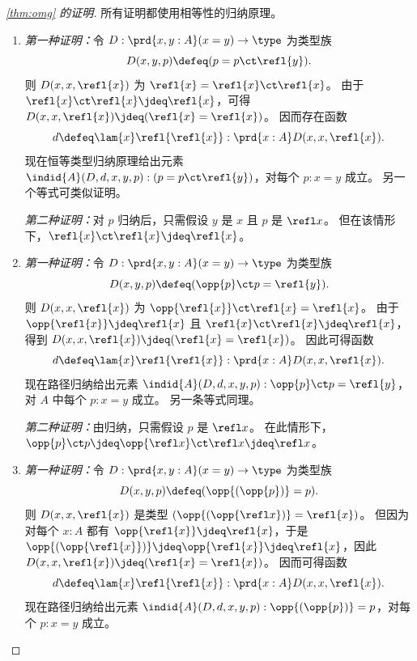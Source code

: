 \begin{proof}[\cref{thm:omg} 的证明]
  所有证明都使用相等性的归纳原理。
  \begin{enumerate}
  \item \emph{第一种证明：}令 $D:\prd{x,y:A} (x=y) \to \type$ 为类型族
    \begin{equation*}
      D(x,y,p)\defeq (p= p\ct \refl{y}).
    \end{equation*}
    则 $D(x,x,\refl{x})$ 为 $\refl{x}=\refl{x}\ct\refl{x}$。
    由于 $\refl{x}\ct\refl{x}\jdeq\refl{x}$，可得 $D(x,x,\refl{x})\jdeq (\refl{x}=\refl{x})$。
    因而存在函数
    \begin{equation*}
      d\defeq\lam{x} \refl{\refl{x}}:\prd{x:A} D(x,x,\refl{x}).
    \end{equation*}
    现在恒等类型归纳原理给出元素 $\indid{A}(D,d,x,y,p):(p= p\ct\refl{y})$，对每个 $p:x= y$ 成立。
    另一个等式可类似证明。

    \mentalpause

    \noindent
    \emph{第二种证明：}对 $p$ 归纳后，只需假设 $y$ 是 $x$ 且 $p$ 是 $\refl x$。
    但在该情形下，$\refl{x}\ct\refl{x}\jdeq\refl{x}$。
  \item \emph{第一种证明：}令 $D:\prd{x,y:A} (x=y) \to \type$ 为类型族
    \begin{equation*}
      D(x,y,p)\defeq (\opp{p}\ct p=  \refl{y}).
    \end{equation*}
    则 $D(x,x,\refl{x})$ 为 $\opp{\refl{x}}\ct\refl{x}=\refl{x}$。
    由于 $\opp{\refl{x}}\jdeq\refl{x}$ 且 $\refl{x}\ct\refl{x}\jdeq\refl{x}$，得到 $D(x,x,\refl{x})\jdeq (\refl{x}=\refl{x})$。
    因此可得函数
    \begin{equation*}
      d\defeq\lam{x} \refl{\refl{x}}:\prd{x:A} D(x,x,\refl{x}).
    \end{equation*}
    现在路径归纳给出元素 $\indid{A}(D,d,x,y,p):\opp{p}\ct p=\refl{y}$，对 $A$ 中每个 $p:x= y$ 成立。
    另一条等式同理。

    \mentalpause

    \noindent \emph{第二种证明：}由归纳，只需假设 $p$ 是 $\refl x$。
    在此情形下，$\opp{p} \ct p \jdeq \opp{\refl x} \ct \refl x \jdeq \refl x$。

  \item \emph{第一种证明：}令 $D:\prd{x,y:A} (x=y) \to \type$ 为类型族
    \begin{equation*}
      D(x,y,p)\defeq (\opp{(\opp{p})}= p).
    \end{equation*}
    则 $D(x,x,\refl{x})$ 是类型 $(\opp{(\opp{\refl x})}=\refl{x})$。
    但因为对每个 $x:A$ 都有 $\opp{\refl{x}}\jdeq \refl{x}$，于是 $\opp{(\opp{\refl{x}})}\jdeq \opp{\refl{x}} \jdeq\refl{x}$，因此 $D(x,x,\refl{x})\jdeq(\refl{x}=\refl{x})$。
    因而可得函数
    \begin{equation*}
      d\defeq\lam{x} \refl{\refl{x}}:\prd{x:A} D(x,x,\refl{x}).
    \end{equation*}
    现在路径归纳给出元素 $\indid{A}(D,d,x,y,p):\opp{(\opp{p})}= p$，对每个 $p:x= y$ 成立。


\end{enumerate}
\end{proof}
